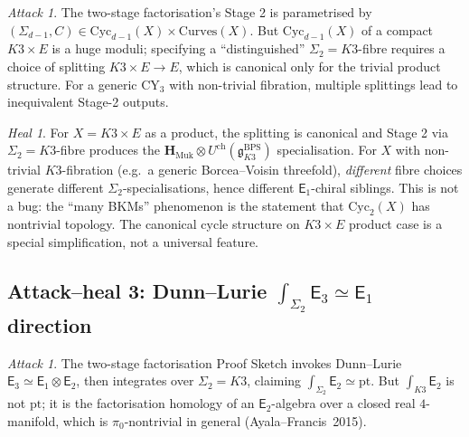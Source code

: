 \documentclass[11pt]{article}
\theoremstyle{definition}
\theoremstyle{remark}
\newtheorem{attack}[theorem]{Attack}
\newtheorem{heal}[theorem]{Heal}
\providecommand{\fg}{\mathfrak{g}}
\providecommand{\Eone}{\mathsf{E}_1}
\providecommand{\Etwo}{\mathsf{E}_2}
\providecommand{\Ethree}{\mathsf{E}_3}
\begin{document}
\begin{attack}
The two-stage factorisation's Stage 2 is parametrised by
$(\Sigma_{d-1},C)\in\mathrm{Cyc}_{d-1}(X)\times\mathrm{Curves}(X)$.
But $\mathrm{Cyc}_{d-1}(X)$ of a compact $K3\times E$ is
a huge moduli; specifying a ``distinguished'' $\Sigma_2 = K3$-fibre
requires a choice of splitting $K3\times E\to E$, which is canonical
only for the trivial product structure. For a generic CY$_3$ with
non-trivial fibration, multiple splittings lead to inequivalent
Stage-2 outputs.
\end{attack}

\begin{heal}
For $X = K3\times E$ as a product, the splitting is canonical and
Stage 2 via $\Sigma_2 = K3$-fibre produces the
$\mathbf{H}_{\mathrm{Muk}}\otimes U^{\mathrm{ch}}(\fg^{\mathrm{BPS}}_{K3})$
specialisation. For $X$ with non-trivial $K3$-fibration (e.g.~a generic
Borcea--Voisin threefold), \emph{different} fibre choices generate
different $\Sigma_2$-specialisations, hence different $\Eone$-chiral
siblings. This is not a bug: the ``many BKMs'' phenomenon is the
statement that $\mathrm{Cyc}_2(X)$ has nontrivial topology. The canonical
cycle structure on $K3\times E$ product case is a special
simplification, not a universal feature.
\end{heal}

\subsection{Attack--heal 3: Dunn--Lurie $\int_{\Sigma_2}\Ethree\simeq\Eone$ direction}

\begin{attack}
The two-stage factorisation Proof Sketch invokes Dunn--Lurie
$\Ethree\simeq\Eone\otimes\Etwo$, then integrates over $\Sigma_2 = K3$,
claiming $\int_{\Sigma_2}\Etwo\simeq\mathrm{pt}$. But $\int_{K3}\Etwo$ is
not $\mathrm{pt}$; it is the factorisation homology of an $\Etwo$-algebra
over a closed real $4$-manifold, which is $\pi_0$-nontrivial in general
(Ayala--Francis~2015).
\end{attack}
\end{document}
